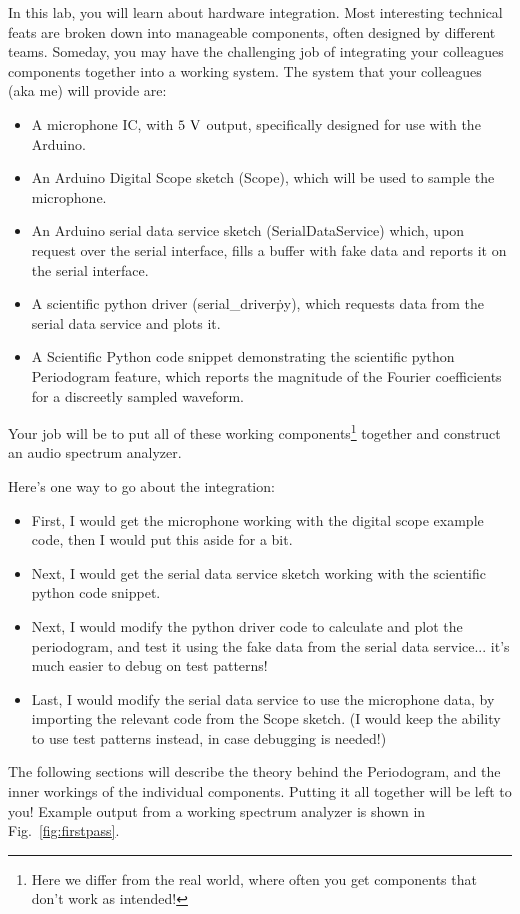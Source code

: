 \documentclass[12pt]{article}
\begin{document}
In this lab, you will learn about hardware integration.  Most interesting technical feats are broken down into manageable components, often designed by different teams.  Someday, you may have the challenging job of integrating your colleagues components together into a working system.   The system that your colleagues (aka me) will provide are:
\begin{itemize}
\item A microphone IC, with $5~\rm V$ output, specifically designed for use with the Arduino.
\item An Arduino Digital Scope sketch (Scope), which will be used to sample the microphone.
\item An Arduino serial data service sketch (SerialDataService) which, upon request over the serial interface, fills a buffer with fake data and reports it on the serial interface.
\item A scientific python driver (serial\_driver\.py), which requests data from the serial data service and plots it.
\item A Scientific Python code snippet demonstrating the scientific python Periodogram feature, which reports the magnitude of the Fourier coefficients for a discreetly sampled waveform.
\end{itemize}
Your job will be to put all of these working components\footnote{Here we differ from the real world, where often you get components that don't work as intended!} together and construct an audio spectrum analyzer. 

Here's one way to go about the integration:  
\begin{itemize}
\item First, I would get the microphone working with the digital scope example code, then I would put this aside for a bit.
\item Next, I would get the serial data service sketch working with the scientific python code snippet.
\item Next, I would modify the python driver code to calculate and plot the periodogram, and test it using the fake data from the serial data service... it's much easier to debug on test patterns!
\item Last, I would modify the serial data service to use the microphone data, by importing the relevant code from the Scope sketch.  (I would keep the ability to use test patterns instead, in case debugging is needed!)
\end{itemize}
The following sections will describe the theory behind the Periodogram, and the inner workings of the individual components.  Putting it all together will be left to you!  Example output from a working spectrum analyzer is shown in Fig.~\ref{fig:firstpass}.
\end{document}
